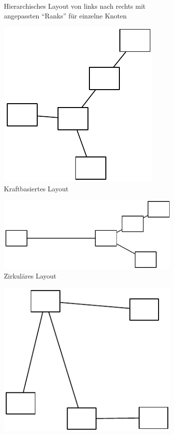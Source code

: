 \begin{figure}[hbt]
\begin{subfigure}{\subfigureshortwidth}
        \caption{Hierarchisches Layout von links nach rechts mit angepassten \enquote{Ranks} für einzelne Knoten}
        \label{fig:omnigraffle-automatic-layout-c}
    \end{subfigure}
    \begin{subfigure}{\subfigureshortwidth}
        \centering
        \includegraphics[scale=\graphicsscale]{resources/omnigraffle-automatic-layout-d}
        \caption{Kraftbasiertes Layout}
        \label{fig:omnigraffle-automatic-layout-d}
    \end{subfigure}
    \begin{subfigure}{\subfigurelongwidth}
        \centering
        \includegraphics[scale=\graphicsscale]{resources/omnigraffle-automatic-layout-e}
        \caption{Zirkuläres Layout}
        \label{fig:omnigraffle-automatic-layout-e}
    \end{subfigure}
    \begin{subfigure}{\subfigureshortwidth}
        \centering
        \includegraphics[scale=\graphicsscale]{resources/omnigraffle-automatic-layout-f}

\end{subfigure}
\end{figure}
